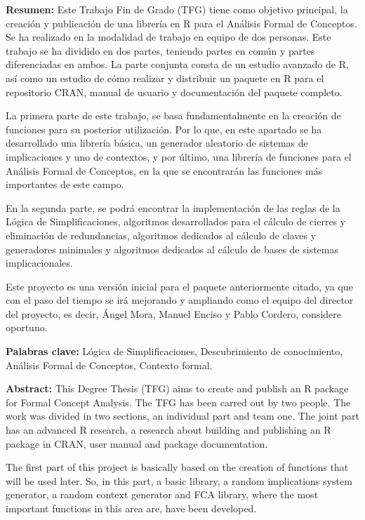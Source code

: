 \setcounter{page}{5}

\textbf{Resumen:} Este Trabajo Fin de Grado (TFG) tiene como objetivo principal, la creaci\'on y publicaci\'on de una librer\'ia 
en R para el An\'alisis Formal de Conceptos. Se ha realizado en la modalidad de trabajo en equipo de dos personas. 
Este trabajo se ha dividido en dos partes, teniendo partes en com\'un y partes diferenciadas en ambos. La parte conjunta 
consta de un estudio avanzado de R, as\'i como un estudio de c\'omo realizar y distribuir un paquete en R para el repositorio 
CRAN, manual de usuario y documentaci\'on del paquete completo.

La primera parte de este trabajo, se basa fundamentalmente en la creaci\'on de funciones para su posterior utilizaci\'on. Por lo que, 
en este apartado se ha desarrollado una librer\'ia b\'asica, un generador aleatorio de sistemas de implicaciones y uno de contextos, y 
por \'ultimo, una librer\'ia de funciones para el An\'alisis Formal de Conceptos, en la que se encontrar\'an las funciones m\'as importantes 
de este campo.

En la segunda parte, se podr\'a encontrar la implementaci\'on de las reglas de la L\'ogica de Simplificaciones, algoritmos desarrollados para 
el c\'alculo de cierres y eliminaci\'on de redundancias, algoritmos dedicados al c\'alculo de claves y generadores minimales y
algoritmos dedicados al c\'alculo de bases de sistemas implicacionales.

Este proyecto es una versi\'on inicial para el paquete anteriormente citado, ya que con el paso del tiempo se ir\'a mejorando y ampliando como 
el equipo del director del proyecto, es decir, \'Angel Mora, Manuel Enciso y Pablo Cordero, considere oportuno.



\bigskip

\textbf{Palabras clave:} L\'ogica de Simplificaciones, Descubrimiento de conocimiento, 
An\'alisis Formal de Conceptos, Contexto formal.

\clearpage

\textbf{Abstract:} This Degree Thesis (TFG) aims to create and publish an R package for Formal Concept Analysis. 
The TFG has been carred out by two people. The work was divided in two sections, an individual 
part and team one. The joint part has an advanced R research, a research about building and publishing 
an R package in CRAN, user manual and package documentation. 

The first part of this project is basically 
based on the creation of functions that will be used later. So, in this part, a basic library, a random 
implications system generator, a random context generator and FCA library, where the most important 
functions in this area are, have been developed. 

